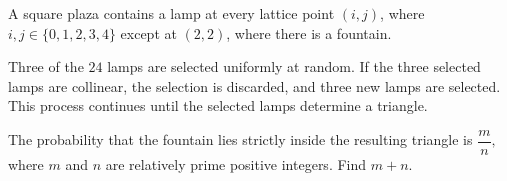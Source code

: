 A square plaza contains a lamp at every lattice point $(i,j)$, where $i,j\in\{0,1,2,3,4\}$ except at $(2,2)$, where there is a fountain.

Three of the $24$ lamps are selected uniformly at random. If the three selected lamps are collinear, the selection is discarded, and three new lamps are selected. This process continues until the selected lamps determine a triangle.

The probability that the fountain lies strictly inside the resulting triangle is $\dfrac{m}{n},$ where $m$ and $n$ are relatively prime positive integers. Find $m+n$.
